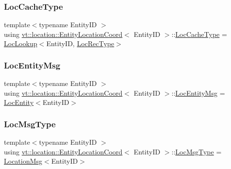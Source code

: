 \subsubsection{\texorpdfstring{Loc\+Cache\+Type}{LocCacheType}}
{\footnotesize\ttfamily template$<$typename Entity\+ID $>$ \\
using \hyperlink{structvt_1_1location_1_1_entity_location_coord}{vt\+::location\+::\+Entity\+Location\+Coord}$<$ Entity\+ID $>$\+::\hyperlink{structvt_1_1location_1_1_entity_location_coord_a8824e120b11c3234534a6dce11fe0c69}{Loc\+Cache\+Type} =  \hyperlink{structvt_1_1location_1_1_loc_lookup}{Loc\+Lookup}$<$Entity\+ID, \hyperlink{structvt_1_1location_1_1_entity_location_coord_a685f9eee868b7b9e01072a5b303548bc}{Loc\+Rec\+Type}$>$}

\mbox{\label{structvt_1_1location_1_1_entity_location_coord_ab0db07ed0b9f75712922733dd467b100}} 
\subsubsection{\texorpdfstring{Loc\+Entity\+Msg}{LocEntityMsg}}
{\footnotesize\ttfamily template$<$typename Entity\+ID $>$ \\
using \hyperlink{structvt_1_1location_1_1_entity_location_coord}{vt\+::location\+::\+Entity\+Location\+Coord}$<$ Entity\+ID $>$\+::\hyperlink{structvt_1_1location_1_1_entity_location_coord_ab0db07ed0b9f75712922733dd467b100}{Loc\+Entity\+Msg} =  \hyperlink{structvt_1_1location_1_1_loc_entity}{Loc\+Entity}$<$Entity\+ID$>$}

\mbox{\label{structvt_1_1location_1_1_entity_location_coord_a8799cbd5fb0fb04cfdd1012fe1d5908f}} 
\subsubsection{\texorpdfstring{Loc\+Msg\+Type}{LocMsgType}}
{\footnotesize\ttfamily template$<$typename Entity\+ID $>$ \\
using \hyperlink{structvt_1_1location_1_1_entity_location_coord}{vt\+::location\+::\+Entity\+Location\+Coord}$<$ Entity\+ID $>$\+::\hyperlink{structvt_1_1location_1_1_entity_location_coord_a8799cbd5fb0fb04cfdd1012fe1d5908f}{Loc\+Msg\+Type} =  \hyperlink{structvt_1_1location_1_1_location_msg}{Location\+Msg}$<$Entity\+ID$>$}

